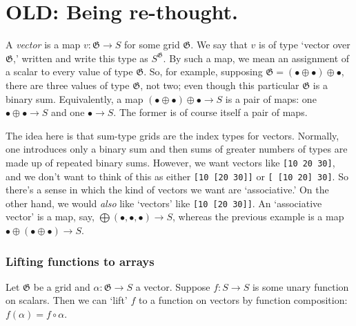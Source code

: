 \documentclass[11pt]{article}
\newcommand{\gr}[1]{\mathfrak{#1}}
\newcommand{\GG}{\gr{G}}
\newcommand{\unit}{\bullet}
\begin{document}
                                                                                                   







\section{OLD: Being re-thought.}
\label{sec:org0f361a3}


A \emph{vector} is a map \(v : \GG\to S\) for some grid \(\GG\). We say that \(v\) is of
type ‘vector over \(\GG\),’ written and write this type as \(S^\GG\). By such a map,
we mean an assignment of a scalar to every value of type \(\GG\). So, for example,
supposing \(\GG = (\unit\oplus\unit) \oplus \unit\), there are three values of
type \(\GG\), not two; even though this particular \(\GG\) is a binary
sum. Equivalently, a map \((\unit\oplus\unit) \oplus \unit\to S\) is a pair of
maps: one \(\unit\oplus\unit\to S\) and one \(\unit\to S\). The former is of course
itself a pair of maps.

The idea here is that sum-type grids are the index types for vectors. Normally,
one introduces only a binary sum and then sums of greater numbers of types are
made up of repeated binary sums. However, we want vectors like \texttt{[10 20 30]}, and
we don't want to think of this as either \texttt{[10 [20 30]]} or \texttt{[ [10 20] 30]}.  So
there's a sense in which the kind of vectors we want are ‘associative.’ On the
other hand, we would \emph{also} like ‘vectors’ like \texttt{[10 [20 30]]}. An ‘associative
vector’ is a map, say, \(\bigoplus(\unit, \unit, \unit)\to S\), whereas the
previous example is a map \(\unit\oplus (\unit\oplus \unit)\to S\).

\subsubsection{Lifting functions to arrays}
\label{sec:orgc0391ab}

Let \(\GG\) be a grid and \(\alpha:\GG\to S\) a vector. Suppose \(f:S\to S\) is some
unary function on scalars. Then we can ‘lift’ \(f\) to a function on vectors by
function composition: \(f(\alpha) = f\circ\alpha\).
\end{document}

